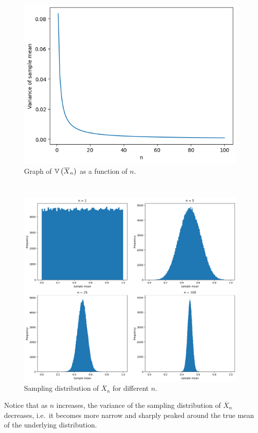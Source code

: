 \begin{ex}
  \inputminted{python}{../code/03-19c.py}

  \begin{figure}[H]
    \centering
    \includegraphics[scale=0.95]{../images/03-19c}
    \caption{Graph of $\mathbb{V}\left(\overline{X}_n\right)$ as a function of $n$.}
  \end{figure}

  \inputminted{python}{../code/03-19d.py}
  \inputminted{text}{../output/03-19d.txt}

  \begin{figure}[H]
    \centering
    \includegraphics[scale=0.535]{../images/03-19d}
    \caption{Sampling distribution of $\overline{X}_n$ for different $n$.}
  \end{figure}

  Notice that as $n$ increases, the variance of the sampling distribution of
  $\overline{X}_n$ decreases, i.e.\ it becomes more narrow and sharply peaked
  around the true mean of the underlying distribution.
\end{ex}

